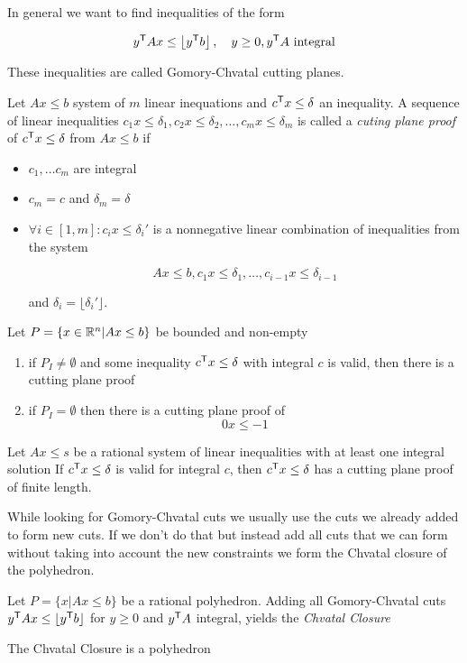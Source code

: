 In general we want to find inequalities of the form

\[{y}^\text{\upshape \sffamily T} A x \leq \left\lfloor {y}^\text{\upshape \sffamily T} b \right \rfloor,\quad y\geq 0, {y}^\text{\upshape \sffamily T} A \text{ integral}\]

These inequalities are called Gomory-Chvatal cutting planes.

\begin{Def} Let $Ax\leq b$ system of $m$ linear inequations and ${c}^\text{\upshape \sffamily T}x\leq \delta$ an inequality. A sequence of linear inequalities $c_1x\leq \delta_1, c_2x\leq \delta_2,\ldots, c_mx\leq \delta_m$ is called a \emph{cuting plane proof} of ${c}^\text{\upshape \sffamily T} x\leq \delta$ from $Ax\leq b$ if
\begin{itemize}
\item $c_1,\ldots c_m$ are integral
\item $c_m=c$ and $\delta_m=\delta$
\item $\forall i\in [1,m]: c_ix\leq \delta_i'$ is a nonnegative linear combination of inequalities from the system

\[Ax\leq b, c_1x\leq \delta_1,\ldots,c_{i-1}x\leq \delta_{i-1}\]

and $\delta_i=\lfloor \delta_i'\rfloor$.
\end{itemize}
\end{Def}

\begin{thm}[Existence] Let $P=\{x\in \mathbb{R}^n | Ax\leq b\}$ be bounded and non-empty

\begin{enumerate}
\item if $P_I\neq \emptyset$ and some inequality ${c}^\text{\upshape \sffamily T} x\leq \delta$ with integral $c$ is valid, then there is a cutting plane proof
\item if $P_I=\emptyset$ then there is a cutting plane proof of 
\[0x\leq -1\]
\end{enumerate}
\end{thm}

\begin{thm} Let $Ax\leq s$ be a rational system of linear inequalities with at least one integral solution If ${c}^\text{\upshape \sffamily T}x\leq \delta$ is valid for integral $c$, then ${c}^\text{\upshape \sffamily T}x\leq \delta$ has a cutting plane proof of finite length.
\end{thm}

While looking for Gomory-Chvatal cuts we usually use the cuts we already added to form new cuts. If we don't do that but instead add all cuts that we can form without taking into account the new constraints we form the Chvatal closure of the polyhedron.

\begin{Def} Let $P=\{x|Ax\leq b\}$ be a rational polyhedron. Adding all Gomory-Chvatal cuts ${y}^\text{\upshape \sffamily T}Ax\leq \lfloor {y}^\text{\upshape \sffamily T} b\rfloor$ for $y\geq 0$ and ${y}^\text{\upshape \sffamily T} A$ integral, yields the \emph{Chvatal Closure}
\end{Def}

\begin{thm} The Chvatal Closure is a polyhedron\end{thm}